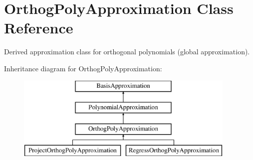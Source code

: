 \section{Orthog\+Poly\+Approximation Class Reference}
\label{classPecos_1_1OrthogPolyApproximation}


Derived approximation class for orthogonal polynomials (global approximation).  


Inheritance diagram for Orthog\+Poly\+Approximation\+:\begin{figure}[H]
\begin{center}
\leavevmode
\includegraphics[height=4.000000cm]{classPecos_1_1OrthogPolyApproximation}
\end{center}
\end{figure}
